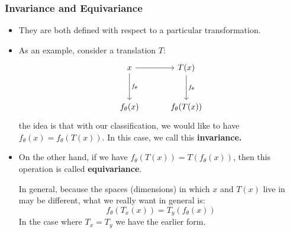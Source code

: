 \subsubsection{Invariance and Equivariance}
\begin{itemize}
	\item They are both defined with respect to a particular transformation.
	\item As an example, consider a translation \( T \):
		\[
			\begin{tikzcd}[sep = 30]
				x \arrow[r] \arrow[d, "f_\theta"] & T(x) \arrow[d, "f_\theta"] \\
				f_{\theta}(x)  &  f_\theta(T(x))	
			\end{tikzcd}
		\]
		the idea is that with our classification, we would like to have \(
		f_\theta(x) = f_\theta(T(x)) \). In this case, we call this
		\textbf{invariance.}
	\item On the other hand, if we have \( f_{\theta}(T(x)) = T(f_{\theta}(x)) \),
		then this operation is called \textbf{equivariance}. 

		In general, because the spaces (dimensions) in which \( x \) and \( T(x) \)
		live in may be different, what we really want in general is:
		\[
			f_{\theta}(T_x(x)) = T_y(f_{\theta}(x))
		\]
		In the case where \( T_x = T_y \) we have the earlier form. 
\end{itemize}
